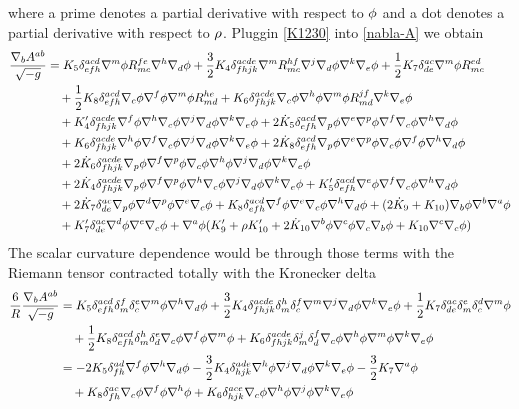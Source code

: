where a prime denotes a partial derivative with respect to $\phi$ and a dot denotes a partial derivative with respect to $\rho$. Pluggin \eqref{K1230} into \eqref{nabla-A} we obtain
\begin{align*}
  \frac{\nabla_b A^{ab}}{\sqrt{-g}}&=K_5\delta^{acd}_{efh}\nabla^m\phi R^{fe}_{mc}\nabla^h\nabla_d\phi +\frac{3}{2}K_4\delta^{acde}_{fhjk}\nabla^mR^{hf}_{mc}\nabla^j\nabla_d\phi \nabla^k\nabla_e\phi +\frac{1}{2}K_7\delta^{ac}_{de}\nabla^m\phi R^{ed}_{mc}\\
  &\quad +\frac{1}{2}K_8\delta^{acd}_{efh}\nabla_c\phi \nabla^f\phi \nabla^m\phi R^{he}_{md}+K_6\delta^{acde}_{fhjk}\nabla_c\phi \nabla^h\phi \nabla^m\phi R^{jf}_{md}\nabla^k\nabla_e\phi\\&\quad  +K_4'\delta^{acde}_{fhjk}\nabla^f\phi\nabla^h\nabla_c\phi \nabla^j\nabla_d\phi \nabla^k\nabla_e\phi +2\dot{K}_5\delta^{acd}_{efh}\nabla_p\phi \nabla^{e}\nabla^p\phi \nabla^f\nabla_c\phi \nabla^h\nabla_d\phi \\&\quad +K_6\delta^{acde}_{fhjk}\nabla^h\phi \nabla^f\nabla_c\phi \nabla^j\nabla_d\phi \nabla^k\nabla_e\phi +2\dot{K}_8\delta^{acd}_{efh}\nabla_p\phi \nabla^{e}\nabla^p\phi \nabla_c\phi\nabla^f\phi\nabla^h\nabla_d\phi \\ &\quad+2\dot{K}_6\delta^{acde}_{fhjk}\nabla_p\phi \nabla^f\nabla^p\phi \nabla_c\phi \nabla^h\phi \nabla^j\nabla_d\phi\nabla^k\nabla_e\phi \\
  &\quad +2\dot{K}_4\delta^{acde}_{fhjk}\nabla_p\phi \nabla^f\nabla^p\phi \nabla^h\nabla_c\phi \nabla^j\nabla_d\phi \nabla^k\nabla_e\phi +K_5'\delta^{acd}_{efh}\nabla^{e}\phi \nabla^f\nabla_c\phi \nabla^h\nabla_d\phi \\
  &\quad +2\dot{K}_7\delta^{ac}_{de}\nabla_p\phi \nabla^d\nabla^p\phi \nabla^{e}\nabla_c\phi +K_8\delta^{acd}_{efh}\nabla^f\phi\nabla^{e}\nabla_c\phi \nabla^h\nabla_d\phi +(2\dot{K}_9+K_{10})\nabla_b\phi \nabla^b\nabla^{a}\phi \\
  &\quad+ K_7'\delta^{ac}_{de}\nabla^d\phi \nabla^{e}\nabla_c\phi +\nabla^{a}\phi (K_9'+\rho K_{10}'+2\dot{K}_{10}\nabla^b\phi \nabla^c\phi \nabla_c\nabla_b\phi +K_{10}\nabla^c\nabla_c\phi )
\end{align*}
The scalar curvature dependence would be through those terms with the Riemann tensor contracted totally with the Kronecker delta
\begin{align*}
  \frac{6}{R}\frac{\nabla_b A^{ab}}{\sqrt{-g}}&=K_5\delta^{acd}_{efh}\delta^f_m\delta^{e}_c\nabla^m\phi \nabla^h\nabla_d\phi +\frac{3}{2}K_4\delta^{acde}_{fhjk}\delta^h_m\delta^f_c\nabla^m\nabla^j\nabla_d\phi \nabla^k\nabla_e\phi +\frac{1}{2}K_7\delta^{ac}_{de}\delta^{e}_m\delta^d_c\nabla^m\phi \\
  &\quad +\frac{1}{2}K_8\delta^{acd}_{efh}\delta^h_m\delta^{e}_d\nabla_c\phi \nabla^f\phi \nabla^m\phi +K_6\delta^{acde}_{fhjk}\delta^j_m\delta^f_d\nabla_c\phi \nabla^h\phi \nabla^m\phi\nabla^k\nabla_e\phi\\
  &=-2K_5\delta^{ad}_{fh}\nabla^f\phi\nabla^h\nabla_d\phi-\frac{3}{2}K_4\delta^{ade}_{hjk}\nabla^h\phi\nabla^j\nabla_d\phi\nabla^k\nabla_e\phi -\frac{3}{2}K_7\nabla^{a}\phi \\
  &\quad +K_8\delta^{ac}_{fh}\nabla_c\phi \nabla^f\phi\nabla^h\phi +K_6\delta^{ace}_{hjk}\nabla_c\phi \nabla^h\phi\nabla^j\phi\nabla^k\nabla_e\phi 
\end{align*}
